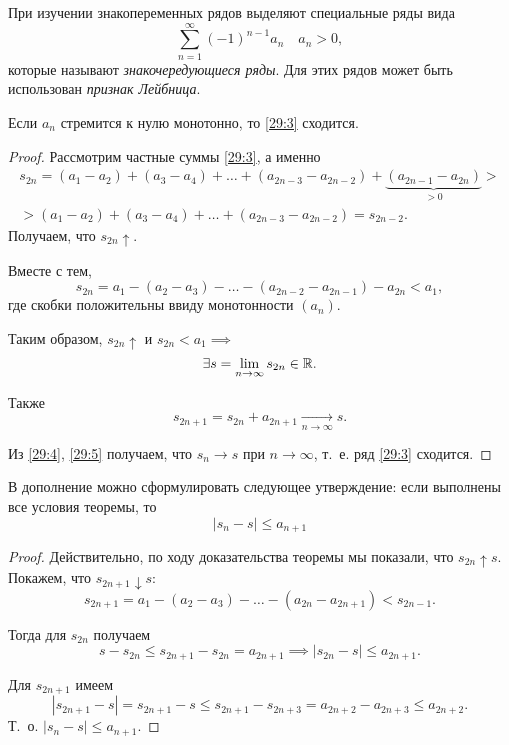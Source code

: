 \documentclass[../../main.tex]{subfiles}
\begin{document}
	При изучении знакопеременных рядов выделяют специальные ряды вида
	\begin{equation}
		\sum_{n = 1}^\infty (-1)^{n - 1}a_n\quad a_n > 0,
		\label{29:3}
	\end{equation}
	которые называют \emph{знакочередующиеся ряды}. 
	Для этих рядов может быть использован \emph{признак Лейбница}.
	\begin{thm}
		\label{29:leibnitz}
		Если $a_n$ стремится к нулю монотонно, то \eqref{29:3} сходится.
	\end{thm}
	\begin{proof}
		Рассмотрим частные суммы \eqref{29:3}, а именно
		\begin{gather*}
			s_{2n} = (a_1 - a_2) + (a_3 - a_4) + \ldots + (a_{2n - 3} - a_{2n - 2}) + 
			\underbrace{(a_{2n - 1} - a_{2n})}_{> 0} >\\
			> (a_1 - a_2) + (a_3 - a_4) + \ldots + (a_{2n - 3} - a_{2n - 2}) = s_{2n - 
			2}.
		\end{gather*}
		Получаем, что $s_{2n}\uparrow$.
		
		Вместе с тем,
		\[s_{2n} = a_1 - (a_{2} - a_3) - \ldots - (a_{2n - 2} - a_{2n - 1}) - a_{2n} 
		< a_1,\]
		где скобки положительны ввиду монотонности $(a_n)$.
		
		Таким образом, $s_{2n}\uparrow$ и $s_{2n} < a_1\implies $
		\begin{equation}
			\exists s = \lim\limits_{n\to\infty}s_{2n}\in\mathbb{R}.
			\label{29:4}
		\end{equation}
		
		Также 
		\begin{equation}
			s_{2n + 1} = s_{2n} + a_{2n + 1}
			\underset{n\to\infty}{\longrightarrow}s.
			\label{29:5}
		\end{equation}
		
		Из \eqref{29:4}, \eqref{29:5} получаем, что $s_n\to s$ при $n\to\infty$, 
		т.~е. ряд 
		\eqref{29:3} сходится.
	\end{proof}

	В дополнение можно сформулировать следующее утверждение: если выполнены все 
	условия 
	теоремы, то
	\begin{equation}
		\left|s_n - s\right|\leq a_{n + 1}
		\label{29:6}
	\end{equation}
	\begin{proof}
		Действительно, по ходу доказательства теоремы мы показали, что 
		$s_{2n}\uparrow s$. 
		Покажем, что $s_{2n + 1}\downarrow s$:
		\[s_{2n + 1} = a_1 - (a_2 - a_3) - \ldots - (a_{2n} - a_{2n + 1}) < s_{2n - 
		1}.\]
		
		Тогда для $s_{2n}$ получаем
		\[s - s_{2n} \leq s_{2n + 1} - s_{2n} = a_{2n + 1}
		\implies |s_{2n} - s|\leq a_{2n + 1}.\]
		
		Для $s_{2n + 1}$ имеем
		\[|s_{2n + 1} - s| = s_{2n + 1} - s 
		\leq s_{2n + 1} - s_{2n + 3} = 
		a_{2n + 2} - a_{2n + 3}\leq a_{2n + 2}.\]
		Т.~о. $|s_n - s|\leq a_{n + 1}$.
	\end{proof}
\end{document}
